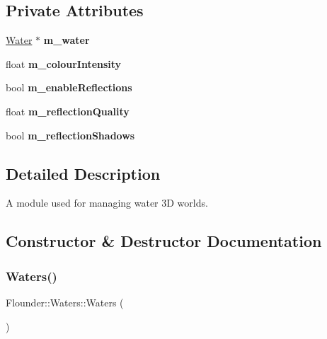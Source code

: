 \subsection*{Private Attributes}
\begin{DoxyCompactItemize}
\item 
\mbox{\label{class_flounder_1_1_waters_ac57f570bb75b0baa19b663613d54fd19}} 
\hyperlink{class_flounder_1_1_water}{Water} $\ast$ {\bfseries m\+\_\+water}
\item 
\mbox{\label{class_flounder_1_1_waters_a4d0754dcfb6caeeee6fb06eacbf2954b}} 
float {\bfseries m\+\_\+colour\+Intensity}
\item 
\mbox{\label{class_flounder_1_1_waters_a21970842cf1bc830d7b9c9bff2f38d0f}} 
bool {\bfseries m\+\_\+enable\+Reflections}
\item 
\mbox{\label{class_flounder_1_1_waters_a57d8cd8fa766248409751ac37f9d7e07}} 
float {\bfseries m\+\_\+reflection\+Quality}
\item 
\mbox{\label{class_flounder_1_1_waters_a8d2af3e447ffd08446ecfcd57917a71d}} 
bool {\bfseries m\+\_\+reflection\+Shadows}
\end{DoxyCompactItemize}


\subsection{Detailed Description}
A module used for managing water 3D worlds. 



\subsection{Constructor \& Destructor Documentation}
\mbox{\label{class_flounder_1_1_waters_a1e721197ae86d5865ebda90abcb34f88}} 
\subsubsection{\texorpdfstring{Waters()}{Waters()}}
{\footnotesize\ttfamily Flounder\+::\+Waters\+::\+Waters (\begin{DoxyParamCaption}{ }\end{DoxyParamCaption})}



